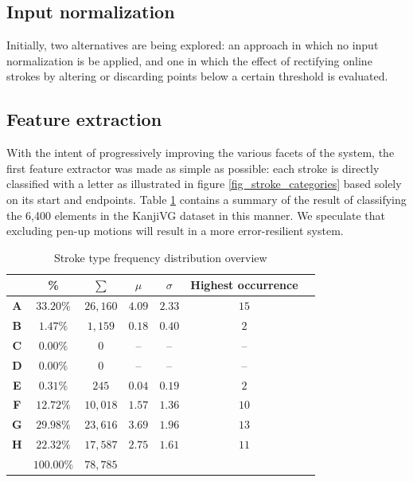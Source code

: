 \documentclass[10pt,conference,a4paper]{IEEEtran}
\begin{document}
	\subsection{Input normalization}

	Initially, two alternatives are being explored: an approach in which no input normalization is be applied, and one 
	in which the effect of rectifying online strokes by altering or discarding points below a certain threshold is evaluated.


	\subsection{Feature extraction}

	With the intent of progressively improving the various facets of the system,
	the first feature extractor was made as simple as possible: each stroke is directly
	classified with a letter as illustrated in figure \ref{fig_stroke_categories} based solely
	on its start and endpoints. Table \ref{tbl_stroke_analysis} contains a summary of the
	result of classifying the 6,400 elements in the KanjiVG dataset in this manner.
	We speculate that excluding pen-up motions will result in a more error-resilient system.


	\begin{table}[b]
		\renewcommand{\arraystretch}{1.3}
		\caption{Stroke type frequency distribution overview }
		\label{tbl_stroke_analysis}
		\centering
		\begin{tabular}{ c | c c c c c l }
			\hline
			  & \bfseries \% & \small $\sum$ & $\mu$ & $\sigma$ & \footnotesize Highest occurrence \\ 
			\hline
			\hline
			\bfseries A & $33.20\%$ & $26,160$ & $4.09$ & $2.33$ & $15$ & \\%
			\bfseries B & $1.47\%$  & $1,159$  & $0.18$ & $0.40$ & $2$  & \\%
			\bfseries C & $0.00\%$  & $0$      & --     & --     & --   & \\%
			\bfseries D & $0.00\%$  & $0$      & --     & --     & --   & \\%
			\bfseries E & $0.31\%$  & $245$    & $0.04$ & $0.19$ & $2$  & \\%
			\bfseries F & $12.72\%$ & $10,018$ & $1.57$ & $1.36$ & $10$ & \\%
			\bfseries G & $29.98\%$ & $23,616$ & $3.69$ & $1.96$ & $13$ & \\%
			\bfseries H & $22.32\%$ & $17,587$ & $2.75$ & $1.61$ & $11$ & \\%
			\hline
			            & $100.00\%$   & $78,785$ &        &        &      & \\
			\hline
		\end{tabular}
	\end{table}
\end{document}
